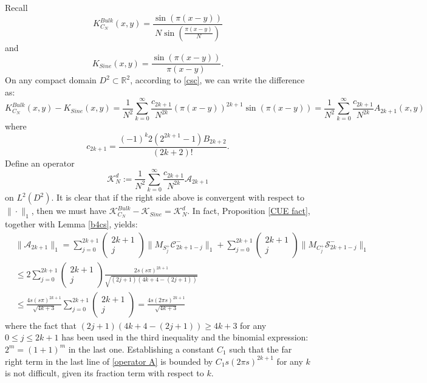 \documentclass[11pt]{article}
\numberwithin{equation}{section}%
\numberwithin{theorem}{section}
\begin{document}
\medbreak{}\enspace Recall
\begin{equation*}
K_{C_N}^{Bulk}(x,y)=\frac{\sin(\pi(x-y))}{N\sin\left(\frac{\pi(x-y)}{N}\right)}
\end{equation*}
and
\begin{equation*}
K_{Sine}(x,y)=\frac{\sin(\pi(x-y))}{\pi(x-y)}.
\end{equation*}
On any compact domain $D^2\subset\mathbb{R}^2$, according to \eqref{csc}, we can write the difference as:
\begin{equation*}
K_{C_N}^{Bulk}(x,y)-K_{Sine}(x,y)=\frac{1}{N^2}\sum_{k=0}^\infty\frac{c_{2k+1}}{N^{2k}}(\pi(x-y))^{2k+1}\sin(\pi(x-y))=\frac{1}{N^2}\sum_{k=0}^\infty\frac{c_{2k+1}}{N^{2k}}A_{2k+1}(x,y)
\end{equation*}
where
\begin{equation*}
    c_{2k+1}=\frac{(-1)^k2(2^{2k+1}-1)B_{2k+2}}{(2k+2)!}.
\end{equation*}
Define an operator
\begin{equation*}
\mathcal{K}^d_N:=\frac{1}{N^2}\sum_{k=0}^\infty\frac{c_{2k+1}}{N^{2k}}\mathcal{A}_{2k+1}
\end{equation*}
on $L^2(D^2)$.
It is clear that if the right side above is convergent with respect to $\|\cdot\|_1$, then we must have $\mathcal{K}_{C_N}^{Bulk}-\mathcal{K}_{Sine}=\mathcal{K}_N^d$. In fact, 
Proposition \ref{CUE fact}, together with Lemma \ref{b4cs}, yields:
\begin{equation}\label{operator A}
\begin{split}
    &\|\mathcal{A}_{2k+1}\|_1=\sum_{j=0}^{2k+1}\left(\begin{matrix}
    2k+1\\
    j
\end{matrix}\right)\|M_{S^+_{j}}\mathcal{C}^-_{2k+1-j}\|_1+\sum_{j=0}^{2k+1}\left(\begin{matrix}
    2k+1\\
    j
\end{matrix}\right)\|M_{C^+_{j}}\mathcal{S}^-_{2k+1-j}\|_1\\&\le2\sum_{j=0}^{2k+1}\left(\begin{matrix}
    2k+1\\
    j
\end{matrix}\right)\frac{2s(s\pi)^{2k+1}}{\sqrt{(2j+1)(4k+4-(2j+1))}}\\&
\le\frac{4s(s\pi)^{2k+1}}{\sqrt{4k+3}}\sum_{j=0}^{2k+1}\left(\begin{matrix}
    2k+1\\j
\end{matrix}\right)=\frac{4s(2\pi s)^{2k+1}}{\sqrt{4k+3}}
\end{split}
\end{equation}
where the fact that $(2j+1)(4k+4-(2j+1))\ge 4k+3$ for any $0\le j\le 2k+1$ has been used in the third inequality and the binomial expression: $2^m=(1+1)^m$ in the last one. Establishing a constant $C_1$ such that the far right term in the last line of \eqref{operator A} is bounded by $C_1s(2\pi s)^{2k+1}$ for any $k$ is not difficult, given its fraction term with respect to $k$.
\end{document}
